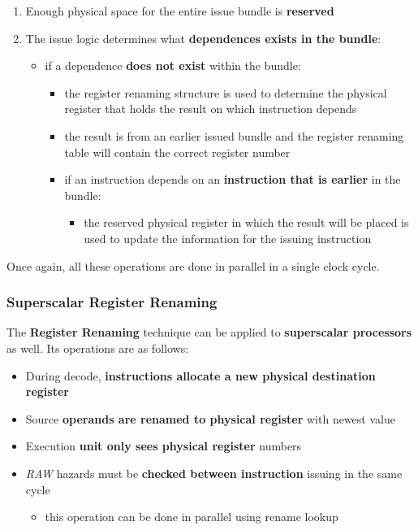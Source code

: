 \documentclass[english]{article}
\begin{document}
\begin{enumerate}
  \item Enough physical space for the entire issue bundle is \textbf{reserved}
  \item The issue logic determines what \textbf{dependences exists in the bundle}:
        \begin{itemize}
          \item if a dependence \textbf{does not exist} within the bundle:
                \begin{itemize}
                  \item the register renaming structure is used to determine the physical register that holds the result on which instruction depends
                  \item the result is from an earlier issued bundle and the register renaming table will contain the correct register number
                \end{itemize}
                \begin{itemize}
                  \item if an instruction depends on an \textbf{instruction that is earlier} in the bundle:
                        \begin{itemize}
                          \item the reserved physical register in which the result will be placed is used to update the information for the issuing instruction
                        \end{itemize}
                \end{itemize}
        \end{itemize}
\end{enumerate}

Once again, all these operations are done in parallel in a single clock cycle.

\subsubsection{Superscalar Register Renaming}

The \textbf{Register Renaming} technique can be applied to \textbf{superscalar processors} as well.
Its operations are as follows:

\begin{itemize}
  \item During decode, \textbf{instructions allocate a new physical destination register}
  \item Source \textbf{operands are renamed to physical register} with newest value
  \item Execution \textbf{unit only sees physical register} numbers
  \item \textit{RAW} hazards must be \textbf{checked between instruction} issuing in the same cycle
        \begin{itemize}
          \item this operation can be done in parallel using rename lookup
        \end{itemize}
\end{itemize}
\end{document}

